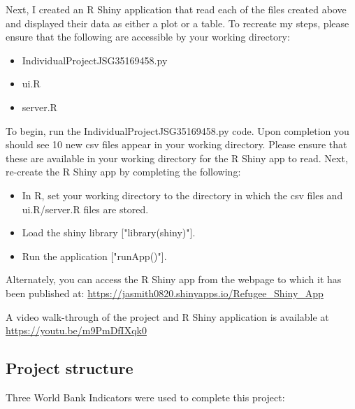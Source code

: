\documentclass{article}
\begin{document}
\noindent
Next, I created an R Shiny application that read each of the files created above and displayed their data as either a plot or a table.
To recreate my steps, please ensure that the following are accessible by your working directory:

\begin{itemize}
\item Individual\textunderscore Project\textunderscore JSG35169458.py

\item ui.R

\item server.R
\end{itemize}

\noindent To begin, run the Individual\textunderscore Project\textunderscore JSG35169458.py code. Upon completion you should see 10 new csv files appear in your working directory. Please ensure that these are available in your working directory for the R Shiny app to read.
Next, re-create the R Shiny app by completing the following:

\begin{itemize}
\item In R, set your working directory to the directory in which the csv files and ui.R/server.R files are stored.

\item Load the shiny library ["library(shiny)"].

\item Run the application ["runApp()"].
\end{itemize}

\noindent Alternately, you can access the R Shiny app from the webpage to which it has been published at: \url{https://jasmith0820.shinyapps.io/Refugee_Shiny_App}\vspace{2mm}

\noindent A video walk-through of the project and R Shiny application is available at \url{https://youtu.be/m9PmDfIXqk0}

\subsection{Project structure}

\noindent Three World Bank Indicators were used to complete this project:
\end{document}
